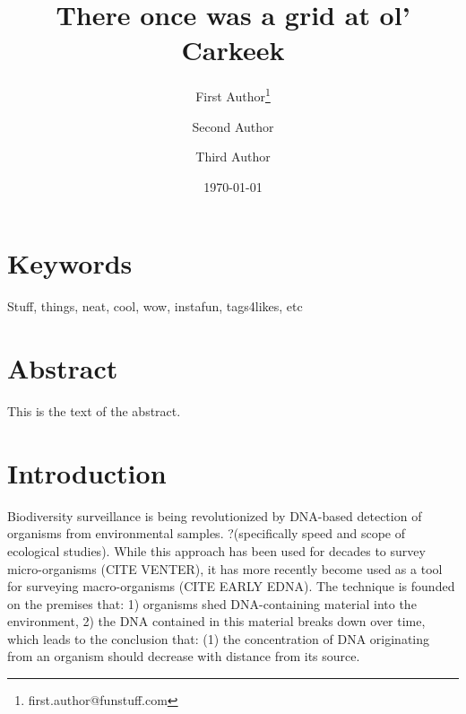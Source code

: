 \documentclass[11pt,letterpaper]{article} %
\date{\today}
\title{There once was a grid at ol' Carkeek}
\author[1]{First Author\thanks{first.author@funstuff.com}}
\author[1,2]{Second Author}
\author[2]{Third Author}
\affil[1]{Department of Computer Science, \LaTeX\ University}
\affil[2]{Department of Mechanical Engineering, Superfabulous University}
\begin{document}
\maketitle
\linenumbers %
\def\linenumberfont{\normalfont\small\rmfamily} %


\section*{Keywords}
Stuff, things, neat, cool, wow, instafun, tags4likes, etc

\section*{Abstract}
This is the text of the abstract.

\section*{Introduction}

Biodiversity surveillance is being revolutionized by DNA-based detection of organisms from environmental samples. ?(specifically speed and scope of ecological studies). %
While this approach has been used for decades to survey micro-organisms (CITE VENTER), it has more recently become used as a tool for surveying macro-organisms (CITE EARLY EDNA).
The technique is founded on the premises that:
1) organisms shed DNA-containing material into the environment, 
2) the DNA contained in this material breaks down over time, 
which leads to the conclusion that:
(1) the concentration of DNA originating from an organism should decrease with distance from its source.

\end{document}

